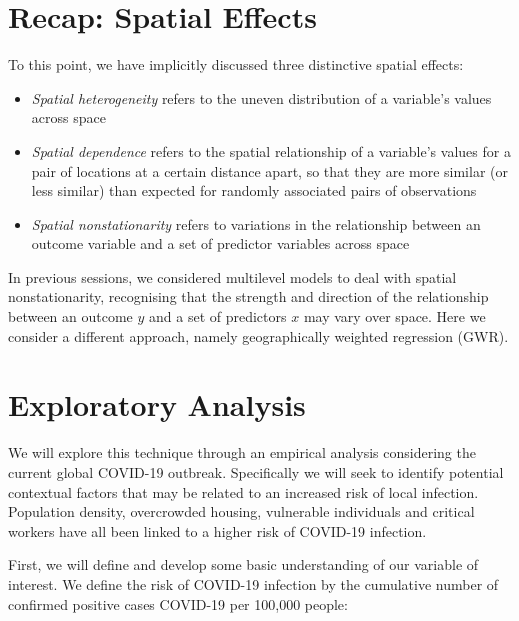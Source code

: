 \documentclass[
]{book}
\begin{document}
\hypertarget{recap-spatial-effects}{%
\section{Recap: Spatial Effects}\label{recap-spatial-effects}}

To this point, we have implicitly discussed three distinctive spatial effects:

\begin{itemize}
\item
  \emph{Spatial heterogeneity} refers to the uneven distribution of a variable's values across space
\item
  \emph{Spatial dependence} refers to the spatial relationship of a variable's values for a pair of locations at a certain distance apart, so that they are more similar (or less similar) than expected for randomly associated pairs of observations
\item
  \emph{Spatial nonstationarity} refers to variations in the relationship between an outcome variable and a set of predictor variables across space
\end{itemize}

In previous sessions, we considered multilevel models to deal with spatial nonstationarity, recognising that the strength and direction of the relationship between an outcome \(y\) and a set of predictors \(x\) may vary over space. Here we consider a different approach, namely geographically weighted regression (GWR).

\hypertarget{exploratory-analysis}{%
\section{Exploratory Analysis}\label{exploratory-analysis}}

We will explore this technique through an empirical analysis considering the current global COVID-19 outbreak. Specifically we will seek to identify potential contextual factors that may be related to an increased risk of local infection. Population density, overcrowded housing, vulnerable individuals and critical workers have all been linked to a higher risk of COVID-19 infection.

First, we will define and develop some basic understanding of our variable of interest. We define the risk of COVID-19 infection by the cumulative number of confirmed positive cases COVID-19 per 100,000 people:
\end{document}
